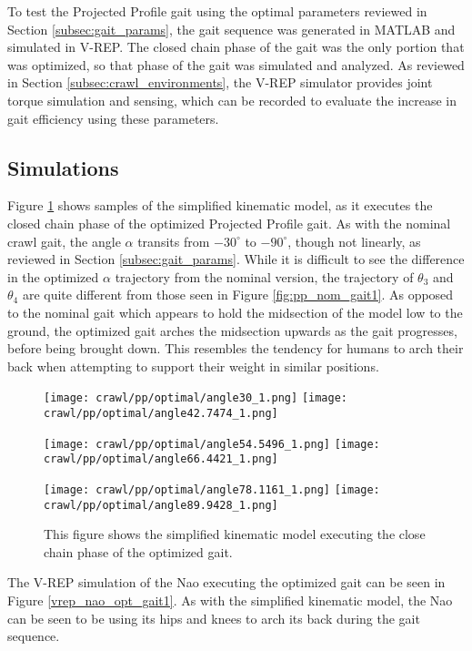 To test the Projected Profile gait using the optimal parameters reviewed in 
Section \ref{subsec:gait_params}, the gait sequence was generated in
MATLAB and simulated in V-REP. The closed chain phase of the gait was the
only portion that was optimized, so that phase of the gait was simulated and
analyzed. As reviewed in Section \ref{subsec:crawl_environments}, the V-REP simulator
provides joint torque simulation and sensing, which can be recorded to evaluate
the increase in gait efficiency using these parameters.

\subsection{Simulations}

Figure \ref{fig:pp_opt_gait1} shows samples of the simplified kinematic model,
as it executes the closed chain phase of the optimized Projected Profile gait.
As with the nominal crawl gait, the angle $\alpha$ transits from $-30^\circ$ to $-90^\circ$,
though not linearly, as reviewed in Section \ref{subsec:gait_params}.
While it is difficult to see the difference in the optimized $\alpha$ trajectory from the
nominal version, the trajectory of $\theta_3$ and $\theta_4$ are quite different
from those seen in Figure \ref{fig:pp_nom_gait1}. As opposed to the nominal gait
which appears to hold the midsection of the model low to the ground, the optimized
gait arches the midsection upwards as the gait progresses, before being brought down. This resembles the tendency for humans to arch their back when attempting
to support their weight in similar positions.

\begin{figure}
  \centerline{
    \texttt{[image: crawl/pp/optimal/angle30\_1.png]}
    \texttt{[image: crawl/pp/optimal/angle42.7474\_1.png]}
  }
  \centerline{
    \texttt{[image: crawl/pp/optimal/angle54.5496\_1.png]}
    \texttt{[image: crawl/pp/optimal/angle66.4421\_1.png]}
  }
  \centerline{
    \texttt{[image: crawl/pp/optimal/angle78.1161\_1.png]}
    \texttt{[image: crawl/pp/optimal/angle89.9428\_1.png]}
  }
  \caption{This figure shows the simplified kinematic model executing the close
           chain phase of the optimized gait.}
  \label{fig:pp_opt_gait1}
\end{figure}

The V-REP simulation of the Nao executing the optimized gait can be seen in
Figure \ref{vrep_nao_opt_gait1}. As with the
simplified kinematic model, the Nao can be seen to be using its hips and knees to arch its back during the gait sequence.

